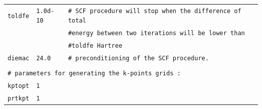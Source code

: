 \documentclass[11pt,a4paper]{article}
\begin{document}
\begin{center}
\begin{tabular}{lll}
\texttt{toldfe} & \texttt{1.0d-10} &\texttt{\# SCF procedure will stop when the difference of total}\\
&&\texttt{\#\space\space\space\space energy between two iterations will be lower than}\\
&&\texttt{\#\space\space\space\space toldfe Hartree}\\
\texttt{diemac} &\texttt{24.0} & \texttt{\# preconditioning of the SCF procedure.}\\
&&\\
\multicolumn{3}{l}{\texttt{\# parameters for generating the k-points grids : }}\\
\texttt{kptopt} & \texttt{1} &\\
\texttt{prtkpt} & \texttt{1} 
\end{tabular}
\end{center} 
\newpage
\end{document}

